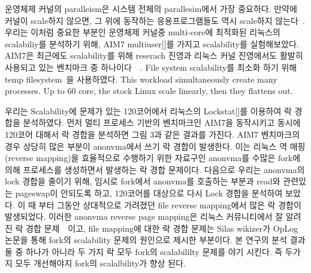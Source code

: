 \ifkor

운영체제 커널의 paralleism은 시스템 전체의 parallesim에서 가장 중요하다. 
만약에 커널이 scale하지 않으면, 그 위에 동작하는 응용프로그램들도 역시 scale하지 않는다~\cite{Clements15SCR}.
우리는 이처럼 중요한 부분인 운영체제 커널중 multi-core에 최적화된 리눅스의 scalabiliy를 분석하기 위해, AIM7
multiuser[]를 가지고 scalability를 실험해보았다.
AIM7은 최근에도 scalability를 위해 reserach 진영과 리눅스 커널 진영에서도 활발히 사용되고 있는 벤치마크 중
하나이다~\cite{Bueso2015STP}~\cite{Bueso2014MCS}.
File system scalability를 최소화 하기 위해 temp filesystem~\cite{Rohland2001Tempfs}을
사용하였다.
This workload simultaneously create many processes.
Up to 60 core, the stock Linux scale linearly, then they flattens out.
\else


\fi


\ifkor
우리는 Scalability에 문제가 있는 120코어에서 리눅스의 Lockstat[]를 이용하여 락 경합을 분석하였다. 
먼저 멀티 프로세스 기반의 벤치마크인 AIM7을 동작시키고 동시에 120코어 대해서 락 경합을 분석하면 
그림 3과 같은 결과를 가진다. 
AIM7 벤치마크의 경우 상당히 많은 부분이 anonvma에서 쓰기 락 경합이 발생한다. 
이는 리눅스 역 매핑(reverse mapping)을 효율적으로 수행하기 위한 자료구인 anonvma를 
수많은 fork에 의해 프로세스를 생성하면서 발생하는 락 경합 문제이다. 
다음으로 우리는 anonvma의 lock 경합을 줄이기 위해, 임시로 fork에서 anonvma를 호출하는 부분과 read와
관련있는 pageswap이 안되도록 하고, 120코어를 대상으로 다시 Lock 경합을 분석하여 보았다.
이 때 부터 그동안 상대적으로 가려졌던 file reverse mapping에서 많은 락 경합이 발생되었다. 
이러한 anonvma reverse page mapping은 리눅스 커뮤니티에서 잘 알려진 락 경합
문제~\cite{Andi2011adding}~\cite{Tim2013adding}이고, file mapping에 대한 락 경합 문제는
Silas wikizer가 OpLog 논문을 통해 fork의 scalability 문제의 원인으로 제시한 부분이다.
본 연구의 분석 결과 둘 중 하나가 아니라 두 가지 락 모두 fork의 scalabililty 문제를 야기 시킨다.
즉 두가지 모두 개선해야지 fork의 scalalbility가 향상 된다. 
\else

\fi


